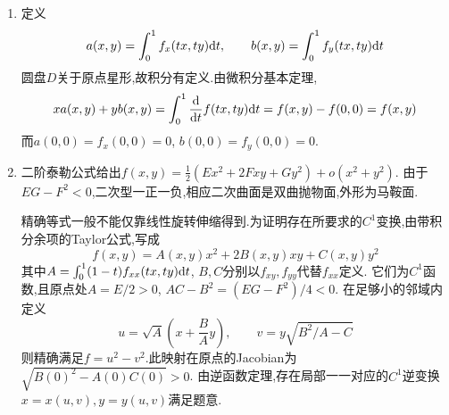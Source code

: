 \documentclass{ctexart}
\begin{document}
\begin{solution}
\begin{enumerate}[label=\tbf{(\arabic*)},leftmargin=*]
\item 定义
\[a(x,y)=\int_0^1f_x(tx,ty)\mathrm{d} t,\qquad b(x,y)=\int_0^1f_y(tx,ty)\mathrm{d} t\]
圆盘$D$关于原点星形,故积分有定义.由微积分基本定理,
\[xa(x,y)+yb(x,y)=\int_0^1\dfrac{\mathrm{d}}{\mathrm{d} t}f(tx,ty)\mathrm{d} t=f(x,y)-f(0,0)=f(x,y)\]
而$a(0,0)=f_x(0,0)=0$, $b(0,0)=f_y(0,0)=0$.
\item 二阶泰勒公式给出$f(x,y)=\frac12(Ex^2+2Fxy+Gy^2)+o(x^2+y^2)$.
由于$EG-F^2<0$,二次型一正一负,相应二次曲面是双曲抛物面,外形为马鞍面.
\begin{center}
\end{center}
精确等式一般不能仅靠线性旋转伸缩得到.为证明存在所要求的$C^1$变换,由带积分余项的Taylor公式,写成
\[f(x,y)=A(x,y)x^2+2B(x,y)xy+C(x,y)y^2\]
其中$A=\int_0^1(1-t)f_{xx}(tx,ty)\mathrm{d} t$, $B,C$分别以$f_{xy},f_{yy}$代替$f_{xx}$定义.
它们为$C^1$函数,且原点处$A=E/2>0$, $AC-B^2=(EG-F^2)/4<0$.
在足够小的邻域内定义
\[u=\sqrt A\left(x+\dfrac BAy\right),\qquad
v=y\sqrt{B^2/A-C}\]
则精确满足$f=u^2-v^2$.此映射在原点的Jacobian为$\sqrt{B(0)^2-A(0)C(0)}>0$.
由逆函数定理,存在局部一一对应的$C^1$逆变换$x=x(u,v),y=y(u,v)$满足题意.
\end{enumerate}
\end{solution}
\end{document}
